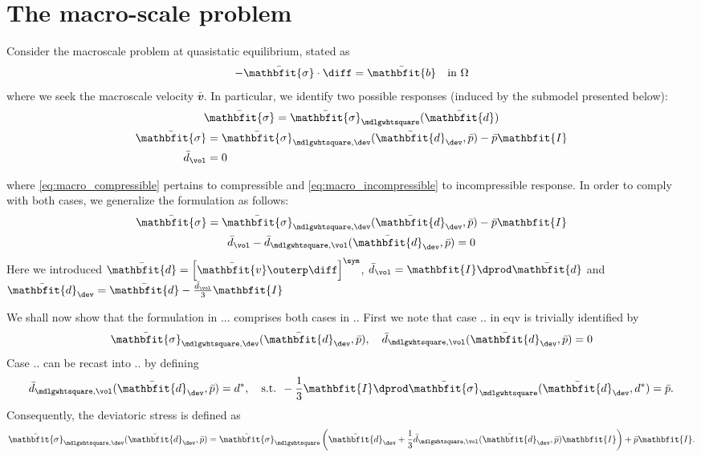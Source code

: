 \documentclass[a4paper,11pt]{article}
\renewcommand{\ta}[1]{\mathbfit{#1}}
\renewcommand{\ts}[1]{\mathbfit{#1}}
\renewcommand{\Box}{\mdlgwhtsquare}
\begin{document}
\section{The macro-scale problem}
Consider the macroscale problem at quasistatic equilibrium, stated as
\begin{align}
 -\bar{\ts\sigma}\cdot \diff = \bar{\ts b} \quad \text{in } \Omega
\end{align}
where we seek the macroscale velocity $\bar{\ts v}$. In particular, we identify two possible responses (induced by the submodel presented below):
\begin{gather}
 \bar{\ts\sigma} = \bar{\ts\sigma}_\Box(\bar{\ts d}) \label{eq:macro_compressible}\\
 \begin{aligned}
   \bar{\ts\sigma} &= \bar{\ts\sigma}_{\Box,\dev}(\bar{\ts d}_\dev, \bar p) - \bar p \ts I\\
   \bar{d}_\vol &= 0
 \end{aligned} \label{eq:macro_incompressible}
\end{gather}

where \eqref{eq:macro_compressible} pertains to compressible and \eqref{eq:macro_incompressible} to incompressible response.
In order to comply with both cases, we generalize the formulation as follows:
\begin{gather}
 \bar{\ts\sigma} = \bar{\ts\sigma}_{\Box,\dev}(\bar{\ts d}_\dev,\bar p) - \bar p\ts I\\
 \bar{d}_\vol - \bar{d}_{\Box,\vol}(\bar{\ts d}_\dev, \bar p) = 0
\end{gather}
Here we introduced $\bar{\ts d} = \left[ \bar{\ta v} \outerp \diff \right]^\sym$, $\bar{d}_\vol = \ts I \dprod \bar{\ts d}$ and $\bar{\ts d}_\dev = \bar{\ts d} - \frac{\bar d_\vol}{3}\ts I$ 

We shall now show that the formulation in ... comprises both cases in ..
First we note that case .. in eqv is trivially identified by 
\begin{align}
 \bar{\ts\sigma}_{\Box,\dev}(\bar{\ts d}_\dev, \bar p), \quad \bar{d}_{\Box,\vol}(\bar{\ts d}_\dev,\bar p) = 0
\end{align}
Case .. can be recast into .. by defining
\begin{align}
 \bar d_{\Box,\vol}(\bar{\ts d}_\dev, \bar p) = d^*,\quad \text{s.t. } -\frac13 \ts I\dprod \bar{\ts\sigma}_\Box(\bar{\ts d}_\dev, d^*) = \bar p.
\end{align}
Consequently, the deviatoric stress is defined as
\begin{align}
 \bar{\ts\sigma}_{\Box,\dev}(\bar{\ts d}_\dev,\bar p) = \bar{\ts\sigma}_\Box\left(\bar{\ts d}_\dev + \frac13 \bar{d}_{\Box,\vol}(\bar{\ts d}_\dev,\bar p)\ts I\right) + \bar p\ts I.
\end{align}
\end{document}
